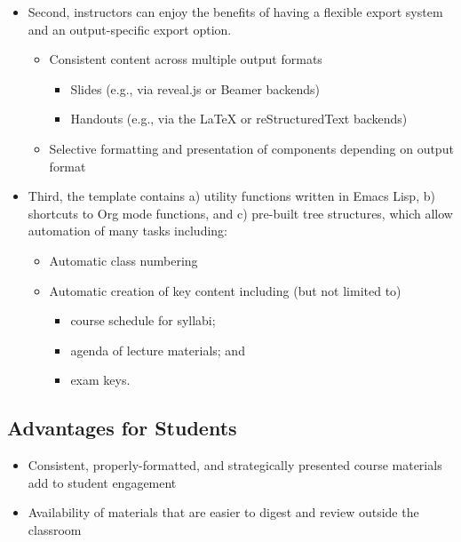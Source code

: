 \documentclass[10pt,article]{article}
\begin{document}
\begin{itemize}
\item Second, instructors can enjoy the benefits of having a flexible export system and an output-specific export option.
\begin{itemize}
\item Consistent content across multiple output formats
\begin{itemize}
\item Slides (e.g., via reveal.js or Beamer backends)
\item Handouts (e.g., via the \LaTeX{} or reStructuredText backends)
\end{itemize}
\item Selective formatting and presentation of components depending on output
format
\end{itemize}
\item Third, the template contains a) utility functions written in Emacs Lisp, b)
shortcuts to Org mode functions, and c) pre-built tree structures, which
allow automation of many tasks including:
\begin{itemize}
\item Automatic class numbering
\item Automatic creation of key content including (but not limited to)
\begin{itemize}
\item course schedule for syllabi;
\item agenda of lecture materials; and
\item exam keys.
\end{itemize}
\end{itemize}
\end{itemize}
\subsection{Advantages for Students}
\label{sec:orgd1ed15e}
\begin{itemize}
\item Consistent, properly-formatted, and strategically presented course materials add to student engagement
\item Availability of materials that are easier to digest and review outside the classroom
\end{itemize}
\end{document}
